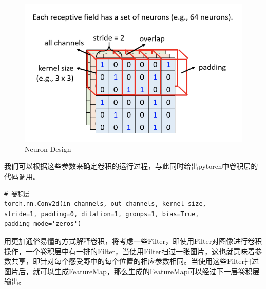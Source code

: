 \documentclass{article}
\begin{document}
\begin{figure}[H]
\begin{minipage}[t]{0.5\linewidth}
	\end{minipage}
	\begin{minipage}[t]{0.5\linewidth}
		\centering
		\includegraphics[scale=0.45]{picture/Convolution4.png}
	\end{minipage}
	\caption{Neuron Design}
	\label{fig:galxy}
\end{figure}
\indent 我们可以根据这些参数来确定卷积的运行过程，与此同时给出pytorch中卷积层的代码调用。\par
\begin{lstlisting}
# 卷积层
torch.nn.Conv2d(in_channels, out_channels, kernel_size, 
stride=1, padding=0, dilation=1, groups=1, bias=True, padding_mode='zeros')
\end{lstlisting}

\indent 用更加通俗易懂的方式解释卷积，将考虑一些Filter，即使用Filter对图像进行卷积操作，一个卷积层中有一排的Filter，当使用Filter扫过一张图片，这也就意味着参数共享，即针对每个感受野中的每个位置的相应参数相同。当使用这些Filter扫过图片后，就可以生成FeatureMap，那么生成的FeatureMap可以经过下一层卷积层输出。\par
\end{document}
